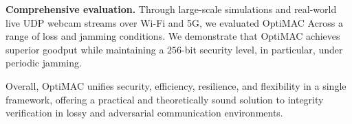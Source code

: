 \textbf{Comprehensive evaluation.} Through large-scale simulations and real-world live UDP webcam streams over Wi-Fi and 5G, we evaluated OptiMAC Across a range of loss and jamming conditions. We demonstrate that OptiMAC achieves superior goodput while maintaining a $256$-bit security level, in particular, under periodic jamming.




Overall, OptiMAC unifies security, efficiency, resilience, and flexibility in a single framework, offering a practical and theoretically sound solution to integrity verification in lossy and adversarial communication environments.






